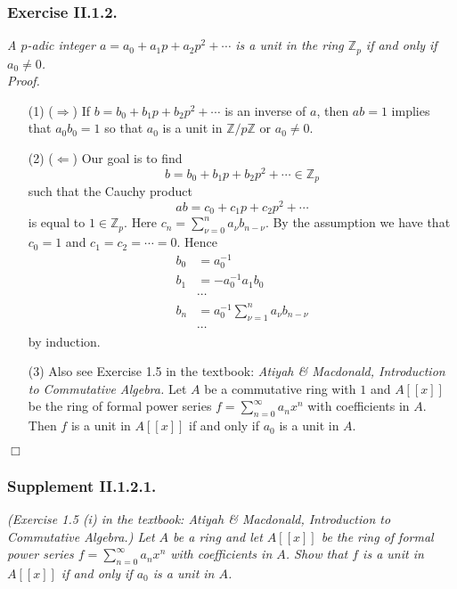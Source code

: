 \documentclass{article}
\begin{document}
\subsubsection*{Exercise II.1.2.}
\emph{A $p$-adic integer $a = a_0 + a_1 p + a_2 p^2 + \cdots$
is a unit in the ring $\mathbb{Z}_p$ if and only if $a_0 \neq 0$.} \\



\emph{Proof.}
\begin{enumerate}
\item[(1)]
  ($\Longrightarrow$)
  If $b = b_0 + b_1 p + b_2 p^2 + \cdots$ is an inverse of $a$,
  then $ab = 1$ implies that $a_0 b_0 = 1$ so that $a_0$ is a unit in $\mathbb{Z}/p\mathbb{Z}$
  or $a_0 \neq 0$.

\item[(2)]
  ($\Longleftarrow$)
  Our goal is to find
  \[
    b = b_0 + b_1 p + b_2 p^2 + \cdots \in \mathbb{Z}_p
  \]
  such that the Cauchy product
  \[
    ab = c_0 + c_1 p + c_2 p^2 + \cdots
  \]
  is equal to $1 \in \mathbb{Z}_p$.
  Here $c_n = \sum_{\nu = 0}^{n} a_{\nu} b_{n-\nu}$.
  By the assumption we have that $c_0 = 1$ and $c_1 = c_2 = \cdots = 0$.
  Hence
  \begin{align*}
    b_0 &= a_0^{-1} \\
    b_1 &= -a_0^{-1} a_1 b_0 \\
    & \cdots \\
    b_n &= a_0^{-1} \sum_{\nu = 1}^{n} a_\nu b_{n-\nu} \\
    & \cdots
  \end{align*}
  by induction.

\item[(3)]
  Also see Exercise 1.5 in the textbook:
  \emph{Atiyah \& Macdonald, Introduction to Commutative Algebra.}
  Let $A$ be a commutative ring with $1$ and $A[[x]]$ be
  the ring of formal power series $f = \sum_{n=0}^{\infty} a_n x^n$
  with coefficients in $A$.
  Then $f$ is a unit in $A[[x]]$ if and only if $a_0$ is a unit in $A$.
\end{enumerate}
$\Box$ \\


\subsubsection*{Supplement II.1.2.1.}
\emph{(Exercise 1.5 (i) in the textbook: Atiyah \& Macdonald, Introduction to Commutative Algebra.)
Let $A$ be a ring and let $A[[x]]$ be the ring of formal power series
$f = \sum_{n=0}^{\infty} a_n x^n$ with coefficients in $A$.
Show that $f$ is a unit in $A[[x]]$ if and only if $a_0$ is a unit in $A$.} \\
\end{document}
